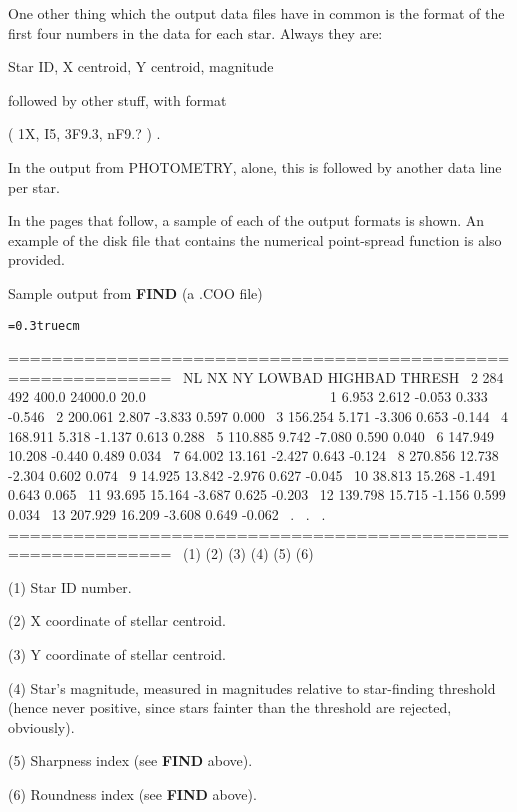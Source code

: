 One other thing which the output data files have in common is the
format of the first four numbers in the data for each star.  Always
they are:

\centerline{Star ID, X centroid, Y centroid, magnitude}

\noindent followed by other stuff, with format

\centerline{( 1X, I5, 3F9.3, nF9.? ) .}

\noindent In the output from PHOTOMETRY, alone, this is followed by
another data line per star.

In the pages that follow, a sample of each of the output formats is
shown.  An example of the disk file that contains the numerical
point-spread function is also provided.
\vfill
\eject
\centerline{Sample output from {\bf FIND} (a .COO file)}
\bigskip
{\noindent\obeylines\obeyspaces\frenchspacing\tt\baselineskip=0.3truecm

=============================================================
\ NL  NX  NY  LOWBAD HIGHBAD  THRESH
\  2 284 492   400.0 24000.0    20.0
~~~~~~~~~~~~~~~~~~~~~~~~
\  1    6.953    2.612   -0.053    0.333   -0.546
\  2  200.061    2.807   -3.833    0.597    0.000
\  3  156.254    5.171   -3.306    0.653   -0.144
\  4  168.911    5.318   -1.137    0.613    0.288
\  5  110.885    9.742   -7.080    0.590    0.040
\  6  147.949   10.208   -0.440    0.489    0.034
\  7   64.002   13.161   -2.427    0.643   -0.124
\  8  270.856   12.738   -2.304    0.602    0.074
\  9   14.925   13.842   -2.976    0.627   -0.045
\ 10   38.813   15.268   -1.491    0.643    0.065
\ 11   93.695   15.164   -3.687    0.625   -0.203
\ 12  139.798   15.715   -1.156    0.599    0.034
\ 13  207.929   16.209   -3.608    0.649   -0.062
\                           .
\                           .
\                           .
=============================================================
\ (1)    (2)      (3)      (4)      (5)      (6)
}
\item{(1)} Star ID number.
\item{(2)} X coordinate of stellar centroid.
\item{(3)} Y coordinate of stellar centroid.
\item{(4)} Star's magnitude, measured in magnitudes relative to star-finding
threshold (hence never positive, since stars fainter than the
threshold are rejected, obviously).
\item{(5)} Sharpness index (see {\bf FIND} above).
\item{(6)} Roundness index (see {\bf FIND} above).
